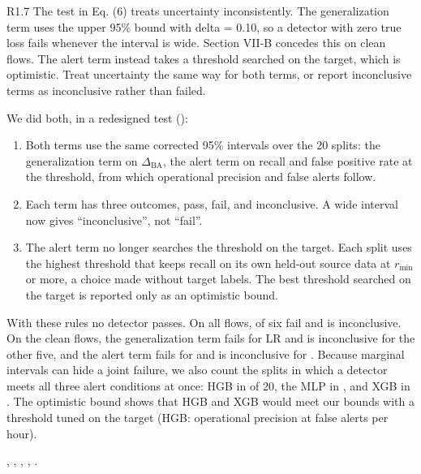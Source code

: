 \label{rv:R1.7}
\begin{concern}{R1.7}
The test in Eq. (6) treats uncertainty inconsistently. The generalization term uses the upper 95\% bound with delta = 0.10, so a detector with zero true loss fails whenever the interval is wide. Section VII-B concedes this on clean flows. The alert term instead takes a threshold searched on the target, which is optimistic. Treat uncertainty the same way for both terms, or report inconclusive terms as inconclusive rather than failed.
\end{concern}
\response We did both, in a redesigned test ():
\begin{enumerate}[leftmargin=*, itemsep=1pt]
\item Both terms use the same corrected 95\% intervals over the 20 splits: the generalization term on $\Delta_{\mathrm{BA}}$, the alert term on recall and false positive rate at the threshold, from which operational precision and false alerts follow.
\item Each term has three outcomes, pass, fail, and inconclusive. A wide interval now gives ``inconclusive'', not ``fail''.
\item The alert term no longer searches the threshold on the target. Each split uses the highest threshold that keeps recall on its own held-out source data at $r_{\min}$ or more, a choice made without target labels. The best threshold searched on the target is reported only as an optimistic bound.
\end{enumerate}
With these rules no detector passes. On all flows, \RTestAllFailN{} of six fail and \RTestAllInconclusiveN{} is inconclusive. On the clean flows, the generalization term fails for LR and is inconclusive for the other five, and the alert term fails for \RTestCleanAlertFailN{} and is inconclusive for \RTestCleanAlertInconclusiveN. Because marginal intervals can hide a joint failure, we also count the splits in which a detector meets all three alert conditions at once: HGB in \RJointHGBClean{} of 20, the MLP in \RJointMLPClean{}, and XGB in \RJointXGBClean{}. The optimistic bound shows that HGB and XGB would meet our bounds with a threshold tuned on the target (HGB: operational precision \ROracleHGBCleanPPV{} at \ROracleHGBCleanAlerts{} false alerts per hour).

\action {}, , , , .
